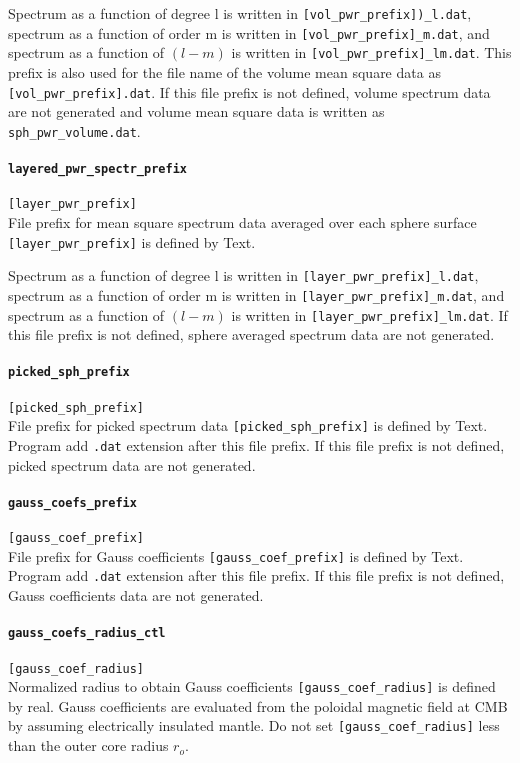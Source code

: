 Spectrum as a function of degree {l} is written in \verb|[vol_pwr_prefix])_l.dat|, spectrum as a function of order {m} is written in \verb|[vol_pwr_prefix]_m.dat|, and spectrum as a function of $(l-m)$ is written in \verb|[vol_pwr_prefix]_lm.dat|. This prefix is also used for the file name of the volume mean square data as \verb|[vol_pwr_prefix].dat|.
If this file prefix is not defined, volume spectrum data are not generated and volume mean square data is written as \verb|sph_pwr_volume.dat|.

\paragraph{\tt layered\_pwr\_spectr\_prefix}
\label{href_t:layered_pwr_spectr_prefix}
\verb|[layer_pwr_prefix]| \\
File prefix for mean square spectrum data averaged over each sphere surface \verb|[layer_pwr_prefix]| is defined by Text.

Spectrum as a function of degree {l} is written in \verb|[layer_pwr_prefix]_l.dat|, spectrum as a function of order {m} is written in \verb|[layer_pwr_prefix]_m.dat|, and spectrum as a function of $(l-m)$ is written in \verb|[layer_pwr_prefix]_lm.dat|. If this file prefix is not defined, sphere averaged spectrum data are not generated. 

\paragraph{\tt picked\_sph\_prefix}
\label{href_t:picked_sph_prefix}
\verb|[picked_sph_prefix]| \\
File prefix for picked spectrum data \verb|[picked_sph_prefix]| is defined by Text. Program add {\tt .dat} extension after this file prefix. If this file prefix is not defined, picked spectrum data are not generated. 

\paragraph{\tt gauss\_coefs\_prefix}
\label{href_t:gauss_coefs_prefix}
\verb|[gauss_coef_prefix]| \\
File prefix for Gauss coefficients \verb|[gauss_coef_prefix]| is defined by Text. Program add {\tt .dat} extension after this file prefix. If this file prefix is not defined, Gauss coefficients data are not generated. 

\paragraph{\tt gauss\_coefs\_radius\_ctl}
\label{href_t:gauss_coefs_radius_ctl}
\verb|[gauss_coef_radius]| \\
Normalized radius to obtain Gauss coefficients \verb|[gauss_coef_radius]| is defined by real. Gauss coefficients are evaluated from the poloidal magnetic field at CMB by assuming electrically insulated mantle. Do not set \verb|[gauss_coef_radius]| less than the outer core radius $r_{o}$.

